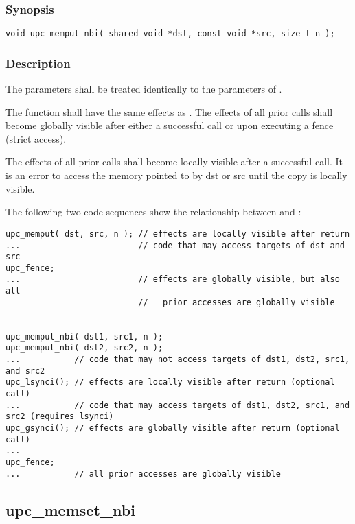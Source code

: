 \subsubsection{Synopsis}

\begin{verbatim}
void upc_memput_nbi( shared void *dst, const void *src, size_t n );
\end{verbatim}

\subsubsection{Description}

\npf The parameters shall be treated identically to the parameters of
\memput{}.

\np The \function{} function shall have the same effects as \memput{}.
The effects of all prior \function{} calls shall become globally visible after 
either a successful \gsynci{} call or upon executing a fence (strict access).

\np The effects of all prior \function{} calls shall become locally 
visible after a successful \lsynci{} call.  It is an error to access the memory
pointed to by dst or src until the copy is locally visible.

\np The following two code sequences show the relationship between
\memput{} and \function{}:

\begin{verbatim} 
upc_memput( dst, src, n ); // effects are locally visible after return
...                        // code that may access targets of dst and src
upc_fence;                 
...                        // effects are globally visible, but also all
                           //   prior accesses are globally visible


upc_memput_nbi( dst1, src1, n );
upc_memput_nbi( dst2, src2, n );
...           // code that may not access targets of dst1, dst2, src1, and src2
upc_lsynci(); // effects are locally visible after return (optional call)
...           // code that may access targets of dst1, dst2, src1, and src2 (requires lsynci)
upc_gsynci(); // effects are globally visible after return (optional call)
...
upc_fence;
...           // all prior accesses are globally visible
\end{verbatim}

\newpage
\subsection{upc\_memset\_nbi}
\def\function{{\tt upc\_memset\_nbi}}

